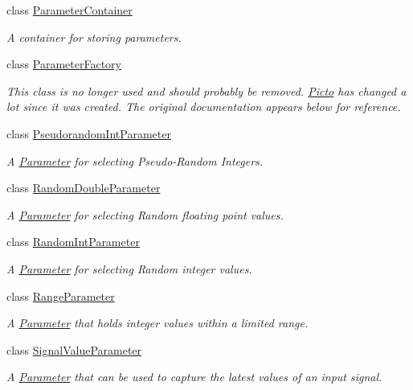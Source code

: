 \begin{DoxyCompactItemize}
class \hyperlink{class_picto_1_1_parameter_container}{Parameter\-Container}
\begin{DoxyCompactList}\small\item\em A container for storing parameters. \end{DoxyCompactList}\item 
class \hyperlink{class_picto_1_1_parameter_factory}{Parameter\-Factory}
\begin{DoxyCompactList}\small\item\em This class is no longer used and should probably be removed. \hyperlink{namespace_picto}{Picto} has changed a lot since it was created. The original documentation appears below for reference. \end{DoxyCompactList}\item 
class \hyperlink{class_picto_1_1_pseudorandom_int_parameter}{Pseudorandom\-Int\-Parameter}
\begin{DoxyCompactList}\small\item\em A \hyperlink{class_picto_1_1_parameter}{Parameter} for selecting Pseudo-\/\-Random Integers. \end{DoxyCompactList}\item 
class \hyperlink{class_picto_1_1_random_double_parameter}{Random\-Double\-Parameter}
\begin{DoxyCompactList}\small\item\em A \hyperlink{class_picto_1_1_parameter}{Parameter} for selecting Random floating point values. \end{DoxyCompactList}\item 
class \hyperlink{class_picto_1_1_random_int_parameter}{Random\-Int\-Parameter}
\begin{DoxyCompactList}\small\item\em A \hyperlink{class_picto_1_1_parameter}{Parameter} for selecting Random integer values. \end{DoxyCompactList}\item 
class \hyperlink{class_picto_1_1_range_parameter}{Range\-Parameter}
\begin{DoxyCompactList}\small\item\em A \hyperlink{class_picto_1_1_parameter}{Parameter} that holds integer values within a limited range. \end{DoxyCompactList}\item 
class \hyperlink{class_picto_1_1_signal_value_parameter}{Signal\-Value\-Parameter}
\begin{DoxyCompactList}\small\item\em A \hyperlink{class_picto_1_1_parameter}{Parameter} that can be used to capture the latest values of an input signal. \end{DoxyCompactList}\item 

\end{DoxyCompactItemize}
